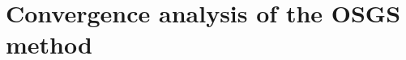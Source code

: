 %       
%
%
\makeatletter
\newif\ifpedagogyshow
\pedagogyshowtrue %
\newsavebox{\pedagogy@bin}
\ifpedagogyshow
\newenvironment{pedagogy}[1][Commentary]{%
  \par\medskip
  \begingroup\pedagogy@color\small
  \list{}{\leftmargin 1.4em \rightmargin 0.4em \topsep 0pt
          \parsep 0.4\baselineskip \listparindent 0pt \itemindent 0pt}%
  \item[]\textbf{\textsf{#1.}}\enspace\ignorespaces
}{%
  \endlist\endgroup\par\medskip
}
\else
\newenvironment{pedagogy}[1][Commentary]{%
  \begingroup\setbox\pedagogy@bin\vbox\bgroup\small
}{%
  \egroup\endgroup
}
\fi
\makeatother

\section{Convergence analysis of the OSGS method}\label{app:osgs}

